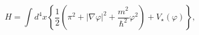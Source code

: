 \begin{equation}
H=\int d^{4}x\left\{  \frac{1}{2}\left(  \pi^{2}+\left|  \nabla\varphi\right|
^{2}+\frac{m^{2}}{\hbar^{2}}\varphi^{2}\right)  +V_{\star}\left(
\varphi\right)  \right\}  ,\label{11}%
\end{equation}

